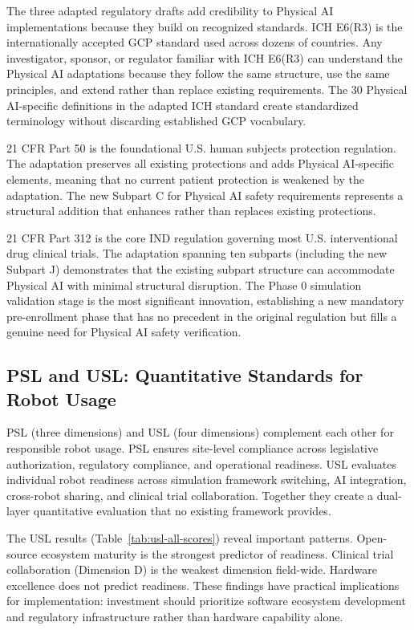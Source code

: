 The three adapted regulatory drafts add credibility to Physical AI
implementations because they build on recognized standards. ICH E6(R3) is the
internationally accepted GCP standard used across dozens of countries. Any
investigator, sponsor, or regulator familiar with ICH E6(R3) can understand
the Physical AI adaptations because they follow the same structure, use the
same principles, and extend rather than replace existing requirements. The 30
Physical AI-specific definitions in the adapted ICH standard create standardized
terminology without discarding established GCP vocabulary.

21 CFR Part 50 is the foundational U.S. human subjects protection regulation.
The adaptation preserves all existing protections and adds Physical AI-specific
elements, meaning that no current patient protection is weakened by the
adaptation. The new Subpart C for Physical AI safety requirements represents a
structural addition that enhances rather than replaces existing protections.

21 CFR Part 312 is the core IND regulation governing most U.S. interventional
drug clinical trials. The adaptation spanning ten subparts (including the new
Subpart J) demonstrates that the existing subpart structure can accommodate
Physical AI with minimal structural disruption. The Phase 0 simulation
validation stage is the most significant innovation, establishing a new
mandatory pre-enrollment phase that has no precedent in the original regulation
but fills a genuine need for Physical AI safety verification.

\subsection{PSL and USL: Quantitative Standards for Robot Usage}
\label{subsec:discuss-standards}

PSL (three dimensions) and USL (four dimensions) complement each other for
responsible robot usage. PSL ensures site-level compliance across legislative
authorization, regulatory compliance, and operational readiness. USL evaluates
individual robot readiness across simulation framework switching, AI
integration, cross-robot sharing, and clinical trial collaboration. Together
they create a dual-layer quantitative evaluation that no existing framework
provides.

The USL results (Table~\ref{tab:usl-all-scores}) reveal important patterns.
Open-source ecosystem maturity is the strongest predictor of readiness. Clinical
trial collaboration (Dimension D) is the weakest dimension field-wide. Hardware
excellence does not predict readiness. These findings have practical
implications for implementation: investment should prioritize software ecosystem
development and regulatory infrastructure rather than hardware capability alone.

